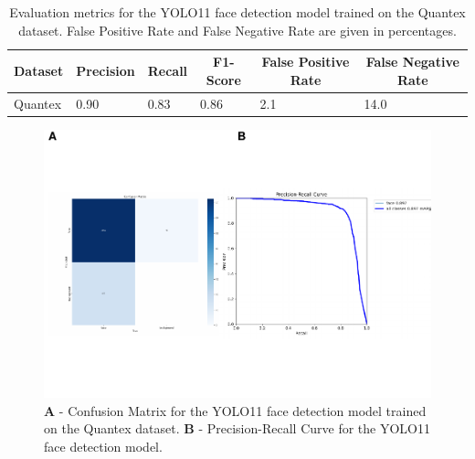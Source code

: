 \documentclass[
  man,floatsintext]{apa6}
\begin{document}
\begin{table}[tbp]

\begin{center}
\begin{threeparttable}

\caption{\label{tab:face-detection-metrics-detailed}Evaluation metrics for the YOLO11 face detection model trained on the Quantex dataset. False Positive Rate and False Negative Rate are given in percentages.}

\begin{tabular}{llllll}
\toprule
Dataset & \multicolumn{1}{c}{Precision} & \multicolumn{1}{c}{Recall} & \multicolumn{1}{c}{F1-Score} & \multicolumn{1}{c}{False Positive Rate} & \multicolumn{1}{c}{False Negative Rate}\\
\midrule
Quantex & 0.90 & 0.83 & 0.86 & 2.1 & 14.0\\
\bottomrule
\end{tabular}

\end{threeparttable}
\end{center}

\end{table}

\begin{figure}

{\centering \includegraphics{Quantex_interaction_paper_files/figure-latex/face-metrics-1} 

}

\caption{\textbf{A} - Confusion Matrix for the YOLO11 face detection model trained on the Quantex dataset. \textbf{B} - Precision-Recall Curve for the YOLO11 face detection model.}\label{fig:face-metrics}
\end{figure}
\end{document}
